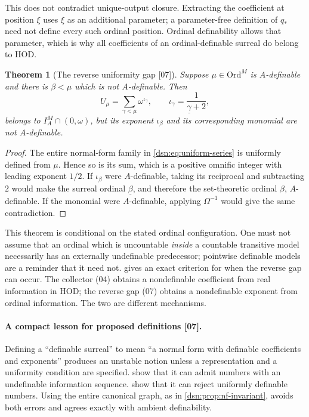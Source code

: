 \documentclass[11pt,a4paper]{article}
\numberwithin{equation}{section}
\newtheorem{theorem}{Theorem}[section]
\theoremstyle{definition}
\theoremstyle{remark}
\newcommand{\Ord}{\mathrm{Ord}}
\newcommand{\HOD}{\mathrm{HOD}}
\newcommand{\src}[1]{\textup{\textsf{\small[#1]}}}
\begin{document}
This does not contradict unique-output closure. Extracting the
coefficient at position $\xi$ uses $\xi$ as an additional parameter;
a parameter-free definition of $q_*$ need not define every such
ordinal position. Ordinal definability allows that parameter, which
is why all coefficients of an ordinal-definable surreal do belong
to $\HOD$.

\begin{theorem}[The reverse uniformity gap \src{07}]\label{dsn:thm:reverse-gap}
Suppose $\mu\in\Ord^M$ is $A$-definable and there is $\beta<\mu$ which is
not $A$-definable. Then
\begin{equation}\label{dsn:eq:uniform-series}
 U_\mu=\sum_{\gamma<\mu}\omega^{\iota_\gamma},\qquad
 \iota_\gamma=\frac1{\underline\gamma+2},
\end{equation}
belongs to $I^M_A\cap(0,\omega)$, but its exponent $\iota_\beta$ and its
corresponding monomial are not $A$-definable.
\end{theorem}
\begin{proof}
The entire normal-form family in \eqref{dsn:eq:uniform-series} is
uniformly defined from $\mu$. Hence so is its sum, which is a positive
omnific integer with leading exponent $1/2$. If $\iota_\beta$ were
$A$-definable, taking its reciprocal and subtracting $2$ would make the
surreal ordinal $\underline\beta$, and therefore the set-theoretic ordinal
$\beta$, $A$-definable. If the monomial were $A$-definable, applying
$\Omega^{-1}$ would give the same contradiction.
\end{proof}

This theorem is conditional on the stated ordinal configuration. One must
not assume that an ordinal which is uncountable \emph{inside} a countable
transitive model necessarily has an externally undefinable predecessor;
pointwise definable models are a reminder that it need not.
 gives an exact criterion for when the reverse gap can
occur. The collector (04) obtains a nondefinable coefficient from real
information in $\HOD$; the reverse gap (07) obtains a nondefinable
exponent from ordinal information. The two are different mechanisms.

\paragraph{A compact lesson for proposed definitions \src{07}.}
Defining a ``definable surreal'' to mean ``a normal form with definable
coefficients and exponents'' produces an unstable notion unless a
representation and a uniformity condition are specified.
 show that it can admit numbers
with an undefinable information sequence.
 show that it can reject
uniformly definable numbers. Using the entire canonical graph, as in
\cref{dsn:prop:nf-invariant}, avoids both errors and agrees exactly with
ambient definability.
\end{document}
